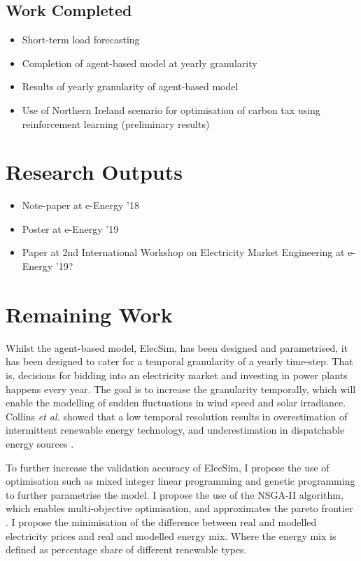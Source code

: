 \documentclass[12pt]{article}
\begin{document}
\subsection{Work Completed}

\begin{itemize}
  \item Short-term load forecasting
  \item Completion of agent-based model at yearly granularity
  \item Results of yearly granularity of agent-based model
  \item Use of Northern Ireland scenario for optimisation of carbon tax using reinforcement learning (preliminary results)
\end{itemize}





\clearpage

\clearpage

\section{Research Outputs}


\begin{itemize}
	\item Note-paper at e-Energy '18
	\item Poster at e-Energy '19
	\item Paper at 2nd International Workshop on Electricity Market Engineering at e-Energy '19?
\end{itemize}

\clearpage

\section{Remaining Work}

Whilst the agent-based model, ElecSim, has been designed and parametrised, it has been designed to cater for a temporal granularity of a yearly time-step. That is, decisions for bidding into an electricity market and investing in power plants happens every year. The goal is to increase the granularity temporally, which will enable the modelling of sudden fluctuations in wind speed and solar irradiance. Collins \textit{et al.} showed that a low temporal resolution results in overestimation of intermittent renewable energy technology, and underestimation in dispatchable energy sources \cite{Collins2017}.

To further increase the validation accuracy of ElecSim, I propose the use of optimisation such as mixed integer linear programming and genetic programming to further parametrise the model. I propose the use of the NSGA-II algorithm, which enables multi-objective optimisation, and approximates the pareto frontier \cite{Valkanas2014}. I propose the minimisation of the difference between real and modelled electricity prices and real and modelled energy mix. Where the energy mix is defined as percentage share of different renewable types.
\end{document}
